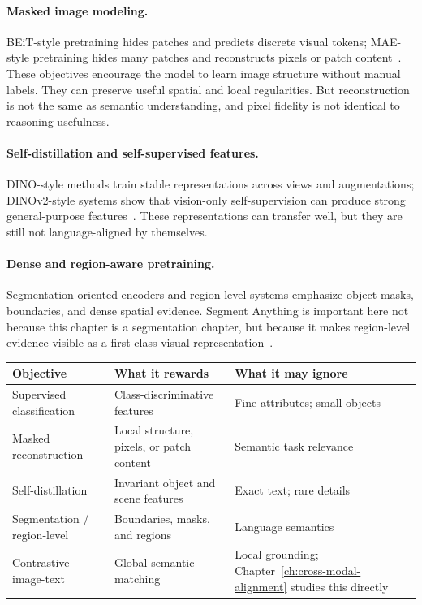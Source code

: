 \paragraph{Masked image modeling.} BEiT-style pretraining hides patches and predicts discrete visual tokens; MAE-style pretraining hides many patches and reconstructs pixels or patch content~\cite{bao2021beit,he2022masked}. These objectives encourage the model to learn image structure without manual labels. They can preserve useful spatial and local regularities. But reconstruction is not the same as semantic understanding, and pixel fidelity is not identical to reasoning usefulness.

\paragraph{Self-distillation and self-supervised features.} DINO-style methods train stable representations across views and augmentations; DINOv2-style systems show that vision-only self-supervision can produce strong general-purpose features~\cite{oquab2023dinov2}. These representations can transfer well, but they are still not language-aligned by themselves.

\paragraph{Dense and region-aware pretraining.} Segmentation-oriented encoders and region-level systems emphasize object masks, boundaries, and dense spatial evidence. Segment Anything is important here not because this chapter is a segmentation chapter, but because it makes region-level evidence visible as a first-class visual representation~\cite{kirillov2023segment}.

\begin{center}
\small
\begin{tabularx}{\textwidth}{@{}p{3.6cm}p{5.3cm}X@{}}
\toprule
\textbf{Objective} & \textbf{What it rewards} & \textbf{What it may ignore} \\
\midrule
Supervised classification & Class-discriminative features & Fine attributes; small objects \\
Masked reconstruction & Local structure, pixels, or patch content & Semantic task relevance \\
Self-distillation & Invariant object and scene features & Exact text; rare details \\
Segmentation / region-level & Boundaries, masks, and regions & Language semantics \\
Contrastive image-text & Global semantic matching & Local grounding; Chapter~\ref{ch:cross-modal-alignment} studies this directly \\
\bottomrule
\end{tabularx}
\end{center}

